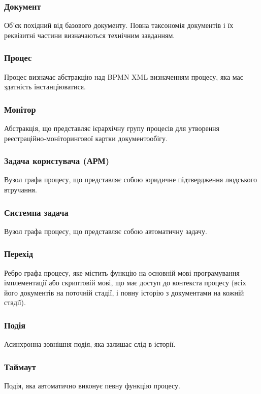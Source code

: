 \documentclass{article}
\begin{document}
\subsubsection{Документ}
Об'єк похідний від базового документу. Повна таксономія документів і їх реквізитні частини визначаються технічним завданням.

\subsubsection{Процес}
Процес визначає абстракцію над BPMN XML визначенням процесу, яка має здатність інстанціюватися.

\subsubsection{Монітор}
Абстракція, що представляє ієрархічну групу процесів для утворення реєстраційно-моніторингової картки документообігу.

\subsubsection{Задача користувача (АРМ)}
Вузол графа процесу, що представляє собою юридичне підтвердження людського втручання.

\subsubsection{Системна задача}
Вузол графа процесу, що представляє собою автоматичну задачу.

\subsubsection{Перехід}
Ребро графа процесу, яке містить функцію на основній мові програмування імплементації або скриптовій мові,
що має доступ до контекста процесу (всіх його документів на поточній стадії, і повну історію з документами на кожній стадії).

\newpage

\subsubsection{Подія}
Асинхронна зовнішня подія, яка залишає слід в історії.

\subsubsection{Таймаут}
Подія, яка автоматично виконує певну функцію процесу.
\end{document}
